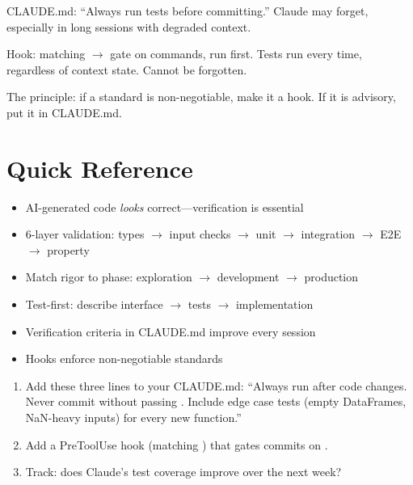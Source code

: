 \begin{whybox}
CLAUDE.md: ``Always run tests before committing.''
Claude may forget, especially in long sessions with degraded context.

Hook:  matching  $\rightarrow$ gate on
 commands, run  first.
Tests run every time, regardless of context state. Cannot be forgotten.

The principle: if a standard is non-negotiable, make it a hook.
If it is advisory, put it in CLAUDE.md.
\end{whybox}

\section{Quick Reference}

\begin{itemize}
  \item AI-generated code \emph{looks} correct---verification is essential
  \item 6-layer validation: types $\rightarrow$ input checks $\rightarrow$ unit $\rightarrow$ integration $\rightarrow$ E2E $\rightarrow$ property
  \item Match rigor to phase: exploration $\rightarrow$ development $\rightarrow$ production
  \item Test-first: describe interface $\rightarrow$ tests $\rightarrow$ implementation
  \item Verification criteria in CLAUDE.md improve every session
  \item Hooks enforce non-negotiable standards
\end{itemize}

\begin{trybox}
\begin{enumerate}
  \item Add these three lines to your CLAUDE.md:
    ``Always run  after code changes.
    Never commit without passing .
    Include edge case tests (empty DataFrames, NaN-heavy inputs)
    for every new function.''
  \item Add a PreToolUse hook (matching ) that gates commits on
    .
  \item Track: does Claude's test coverage improve over the next week?
\end{enumerate}
\end{trybox}
